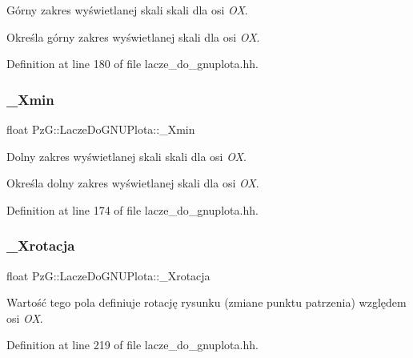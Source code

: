 Górny zakres wyświetlanej skali skali dla osi {\itshape OX}. 

Określa górny zakres wyświetlanej skali dla osi {\itshape OX}. 

Definition at line 180 of file lacze\+\_\+do\+\_\+gnuplota.\+hh.

\mbox{\label{class_pz_g_1_1_lacze_do_g_n_u_plota_a69d530edfe769e38448972e897456deb}} 
\subsubsection{\texorpdfstring{\+\_\+\+Xmin}{\_Xmin}}
{\footnotesize\ttfamily float Pz\+G\+::\+Lacze\+Do\+G\+N\+U\+Plota\+::\+\_\+\+Xmin\hspace{0.3cm}{\ttfamily [protected]}}



Dolny zakres wyświetlanej skali skali dla osi {\itshape OX}. 

Określa dolny zakres wyświetlanej skali dla osi {\itshape OX}. 

Definition at line 174 of file lacze\+\_\+do\+\_\+gnuplota.\+hh.

\mbox{\label{class_pz_g_1_1_lacze_do_g_n_u_plota_a21e77f0a2bfb7fed989b6dc2d64b5a7e}} 
\subsubsection{\texorpdfstring{\+\_\+\+Xrotacja}{\_Xrotacja}}
{\footnotesize\ttfamily float Pz\+G\+::\+Lacze\+Do\+G\+N\+U\+Plota\+::\+\_\+\+Xrotacja\hspace{0.3cm}{\ttfamily [protected]}}

Wartość tego pola definiuje rotację rysunku (zmiane punktu patrzenia) względem osi {\itshape OX}. 

Definition at line 219 of file lacze\+\_\+do\+\_\+gnuplota.\+hh.

\mbox{\label{class_pz_g_1_1_lacze_do_g_n_u_plota_a2c9303c4dbb4c9f0ddc4f1fe02eb3f70}} 
